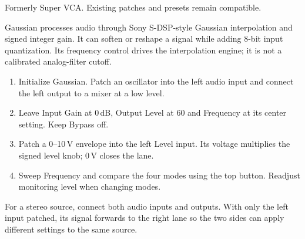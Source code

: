 Formerly Super VCA. Existing patches and presets remain compatible.

Gaussian processes audio through Sony S-DSP-style Gaussian interpolation
and signed integer gain. It can soften or reshape a signal while adding
8-bit input quantization. Its frequency control drives the interpolation
engine; it is not a calibrated analog-filter cutoff.

\begin{enumerate}
\item Initialize Gaussian. Patch an oscillator into the left audio input
and connect the left output to a mixer at a low level.
\item Leave Input Gain at 0\,dB, Output Level at 60 and Frequency at its
center setting. Keep Bypass off.
\item Patch a 0--10\,V envelope into the left Level input. Its voltage
multiplies the signed level knob; 0\,V closes the lane.
\item Sweep Frequency and compare the four modes using the top button.
Readjust monitoring level when changing modes.
\end{enumerate}

For a stereo source, connect both audio inputs and outputs. With only the
left input patched, its signal forwards to the right lane so the two sides
can apply different settings to the same source.
